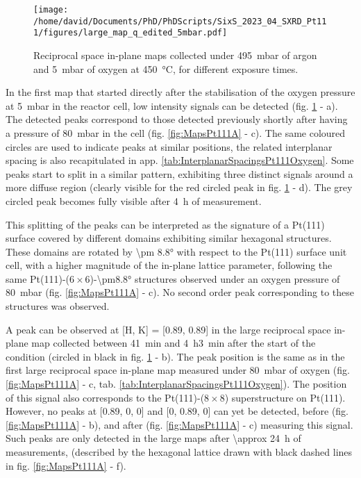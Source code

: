 \begin{figure}[!htb]
    \centering
    \texttt{[image: /home/david/Documents/PhD/PhDScripts/SixS\_2023\_04\_SXRD\_Pt111/figures/large\_map\_q\_edited\_5mbar.pdf]}
    \caption{
        Reciprocal space in-plane maps collected under \qty{495}{\milli\bar} of argon and \qty{5}{\milli\bar} of oxygen at \qty{450}{\degreeCelsius}, for different exposure times.
    }
    \label{fig:LargeMapsPt111LowOxygen}
\end{figure}

In the first map that started directly after the stabilisation of the oxygen pressure at \qty{5}{\milli\bar} in the reactor cell, low intensity signals can be detected (fig. \ref{fig:LargeMapsPt111LowOxygen} - a).
The detected peaks correspond to those detected previously shortly after having a pressure of \qty{80}{\milli\bar} in the cell (fig. \ref{fig:MapsPt111A} - c).
The same coloured circles are used to indicate peaks at similar positions, the related interplanar spacing is also recapitulated in app. \ref{tab:InterplanarSpacingsPt111Oxygen}.
Some peaks start to split in a similar pattern, exhibiting three distinct signals around a more diffuse region (clearly visible for the red circled peak in fig. \ref{fig:LargeMapsPt111LowOxygen} - d).
The grey circled peak becomes fully visible after \qty{4}{\hour} of measurement.

This splitting of the peaks can be interpreted as the signature of a Pt(111) surface covered by different domains exhibiting similar hexagonal structures.
These domains are rotated by \ang{\pm 8.8} with respect to the Pt(111) surface unit cell, with a higher magnitude of the in-plane lattice parameter, following the same Pt(111)-($6\times6$)-\ang{\pm8.8} structures observed under an oxygen pressure of \qty{80}{\milli\bar} (fig. \ref{fig:MapsPt111A} - c).
No second order peak corresponding to these structures was observed.

A peak can be observed at [H, K] = [0.89, 0.89] in the large reciprocal space in-plane map collected between \qty{41}{\minute} and \qty{4}{\hour}\qty{3}{\minute} after the start of the condition (circled in black in fig. \ref{fig:LargeMapsPt111LowOxygen} - b).
The peak position is the same as in the first large reciprocal space in-plane map measured under \qty{80}{\milli\bar} of oxygen (fig. \ref{fig:MapsPt111A} - c, tab. \ref{tab:InterplanarSpacingsPt111Oxygen}).
The position of this signal also corresponds to the Pt(111)-($8\times8$) superstructure on Pt(111).
However, no peaks at [0.89, 0, 0] and [0, 0.89, 0] can yet be detected, before (fig. \ref{fig:MapsPt111A} - b), and after (fig. \ref{fig:MapsPt111A} - c) measuring this signal.
Such peaks are only detected in the large maps after \qty{\approx 24}{\hour} of measurements, (described by the hexagonal lattice drawn with black dashed lines in fig. \ref{fig:MapsPt111A} - f).

